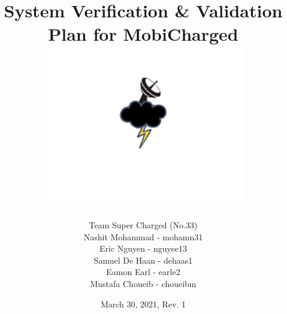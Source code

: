 \documentclass[12pt, titlepage]{article}
\begin{document}
\title{
    System Verification \& Validation Plan for MobiCharged\\
    \includegraphics[width=9cm]{images/mobicharged.png} 
}
\author{Team Super Charged (No.33)
		\\ Nashit Mohammad - mohamn31
		\\ Eric Nguyen - nguyee13
		\\ Samuel De Haan - dehaas1
		\\ Eamon Earl - earle2
		\\ Mustafa Choueib - choueibm
}
    

\date{March 30, 2021, Rev. 1}


\maketitle

\tableofcontents
\listoffigures
\listoftables

\vspace{20pt}


\newpage

\end{document}
